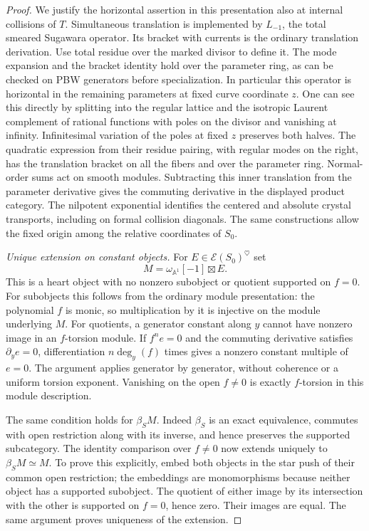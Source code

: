 \documentclass[11pt]{article}
\numberwithin{equation}{section}
\theoremstyle{definition}
\theoremstyle{remark}
\begin{document}
\begin{proof}
We justify the horizontal assertion in this presentation also at
internal collisions of $T$.  Simultaneous translation is implemented
by $L_{-1}$, the total smeared Sugawara operator.  Its bracket with
currents is the ordinary translation derivation.  Use total residue
over the marked divisor to define it.  The mode expansion and the
bracket identity hold over the parameter ring, as can be checked on
PBW generators before specialization.  In particular this operator
is horizontal in the remaining parameters at fixed curve coordinate
$z$.  One can see this directly by splitting into the regular
lattice and the isotropic Laurent complement of rational functions
with poles on the divisor and vanishing at infinity.  Infinitesimal
variation of the poles at fixed $z$ preserves both halves.  The
quadratic expression from their residue pairing, with regular modes
on the right, has the translation bracket on all the fibers and
over the parameter ring.  Normal-order sums act on smooth modules.
Subtracting this inner translation from the parameter derivative
gives the commuting derivative in the displayed product category.
The nilpotent exponential identifies the centered and absolute
crystal transports, including on formal collision diagonals.
The same constructions allow the fixed origin among the relative
coordinates of $S_0$.

\smallskip
\noindent\emph{Unique extension on constant objects.}
For $E\in\mathcal E(S_0)^\heartsuit$ set
\[
                        M=\omega_{\mathbb A^1}[-1]\boxtimes E.
\]
This is a heart object with no nonzero subobject or quotient
supported on $f=0$.  For subobjects this follows from the ordinary
module presentation: the polynomial $f$ is monic, so multiplication
by it is injective on the module underlying $M$.  For quotients,
a generator constant along $y$ cannot have nonzero image in an
$f$-torsion module.  If $f^n e=0$ and the commuting derivative
satisfies $\partial_y e=0$, differentiation
$n\deg_y(f)$ times gives a nonzero constant multiple of $e=0$.
The argument applies generator by generator, without coherence
or a uniform torsion exponent.  Vanishing on the open $f\ne0$
is exactly $f$-torsion in this module description.

The same condition holds for $\beta_S M$.  Indeed $\beta_S$ is
an exact equivalence, commutes with open restriction along with
its inverse, and hence preserves the supported subcategory.
The identity comparison over $f\ne0$ now extends uniquely to
$\beta_S M\simeq M$.  To prove this explicitly, embed both
objects in the star push of their common open restriction; the
embeddings are monomorphisms because neither object has a
supported subobject.  The quotient of either image by its
intersection with the other is supported on $f=0$, hence zero.
Their images are equal.  The same argument proves uniqueness of
the extension.


\end{proof}
\end{document}
